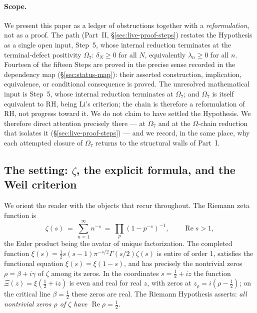 \documentclass[11pt]{amsart}
\theoremstyle{definition}
\theoremstyle{remark}
\theoremstyle{definition}
\renewcommand{\Re}{\operatorname{Re}}
\begin{document}
\paragraph{Scope.}
We present this paper as a ledger of obstructions together with a \emph{reformulation}, not as a proof. The path (Part~II, \S\ref{sec:live-proof-steps}) restates the Hypothesis as a single open input,
Step~5, whose internal reduction terminates at the terminal-defect positivity $\Omega_7$: $\delta_N\ge0$
for all $N$, equivalently $\lambda_n\ge0$
for all $n$. Fourteen of the fifteen Steps are proved in the precise sense recorded in the dependency map
(\S\ref{sec:status-map}): their asserted construction, implication, equivalence, or conditional
consequence is proved. The unresolved mathematical input is Step~5, whose internal reduction terminates
at $\Omega_7$; and $\Omega_7$ is itself equivalent to
RH, being Li's criterion; the chain is therefore a reformulation of RH, not progress toward it. We do
not claim to have settled the Hypothesis. We therefore direct attention precisely there --- at $\Omega_7$ and at the
$\Omega$-chain reduction that isolates it (\S\ref{sec:live-proof-steps}) --- and we record, in the same
place, why each attempted closure of $\Omega_7$ returns to the structural walls of Part~I.

\subsection*{The setting: $\zeta$, the explicit formula, and the Weil criterion}

We orient the reader with the objects that recur throughout. The Riemann zeta function is
\[
   \zeta(s)\ =\ \sum_{n=1}^\infty n^{-s}\ =\ \prod_p (1-p^{-s})^{-1},\qquad\Re s>1,
\]
the Euler product being the avatar of unique factorization. The completed function $\xi(s)=
\tfrac12 s(s-1)\pi^{-s/2}\Gamma(s/2)\zeta(s)$ is entire of order 1, satisfies the functional equation
$\xi(s)=\xi(1-s)$, and has precisely the nontrivial zeros $\rho=\beta+i\gamma$ of $\zeta$ among its zeros.
In the coordinates $s=\tfrac12+iz$ the function $\Xi(z)=\xi(\tfrac12+iz)$ is even and real for real $z$,
with zeros at $z_\rho=i(\rho-\tfrac12)$; on the critical line $\beta=\tfrac12$ these zeros are real.
The Riemann Hypothesis asserts: \emph{all nontrivial zeros $\rho$ of $\zeta$ have $\Re\rho=\tfrac12$.}
\end{document}
